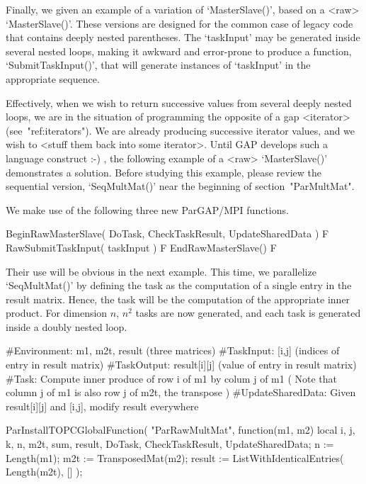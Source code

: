 

Finally, we given an example of a variation of `MasterSlave()', based
on a <raw> `MasterSlave()'.  These versions are designed for the
common case of legacy code that contains deeply nested parentheses.
The `taskInput' may be generated inside several nested loops, making
it awkward and error-prone to produce a function, `SubmitTaskInput()',
that will generate instances of `taskInput' in the appropriate
sequence.

Effectively, when we wish to return successive values from several deeply
nested loops, we are in the situation of programming the opposite of a
gap <iterator> (see~"ref:iterators").  We are already producing
successive iterator values, and we wish to <stuff them back into some
iterator>.  Until GAP develops such a language construct :-) , the
following example of a <raw> `MasterSlave()' demonstrates a solution.
Before studying this example, please review the sequential version,
`SeqMultMat()' near the beginning of section~"ParMultMat".


We make use of the following three new ParGAP/MPI functions.

\>BeginRawMasterSlave( DoTask, CheckTaskResult, UpdateSharedData ) F
\>RawSubmitTaskInput( taskInput ) F
\>EndRawMasterSlave() F

Their use will be obvious in the next example.  This time, we
parallelize `SeqMultMat()' by defining the task as the computation of a
single entry in the result matrix.  Hence, the task will be the
computation of the appropriate inner product.  For dimension $n$,
$n^2$ tasks are now generated, and each task is generated inside a
doubly nested loop.

\beginexample
#Environment: m1, m2t, result (three matrices)
#TaskInput:   [i,j] (indices of entry in result matrix)
#TaskOutput:  result[i][j] (value of entry in result matrix)
#Task:        Compute inner produce of row i of m1 by colum j of m1
              ( Note that column j of m1 is also row j of m2t, the transpose )
#UpdateSharedData:  Given result[i][j] and [i,j], modify result everywhere

ParInstallTOPCGlobalFunction( "ParRawMultMat", function(m1, m2)
  local i, j, k, n, m2t, sum, result, DoTask, CheckTaskResult, UpdateSharedData;
  n := Length(m1);
  m2t := TransposedMat(m2);
  result := ListWithIdenticalEntries( Length(m2t), [] );

